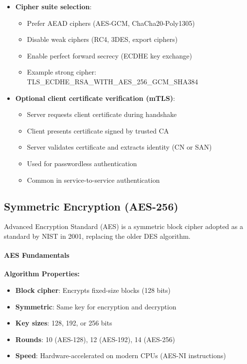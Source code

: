 \begin{itemize}
    \item \textbf{Cipher suite selection}:
    \begin{itemize}
        \item Prefer AEAD ciphers (AES-GCM, ChaCha20-Poly1305)
        \item Disable weak ciphers (RC4, 3DES, export ciphers)
        \item Enable perfect forward secrecy (ECDHE key exchange)
        \item Example strong cipher: TLS\_ECDHE\_RSA\_WITH\_AES\_256\_GCM\_SHA384
    \end{itemize}
    
    \item \textbf{Optional client certificate verification (mTLS)}:
    \begin{itemize}
        \item Server requests client certificate during handshake
        \item Client presents certificate signed by trusted CA
        \item Server validates certificate and extracts identity (CN or SAN)
        \item Used for passwordless authentication
        \item Common in service-to-service authentication
    \end{itemize}
\end{itemize}

\subsection{Symmetric Encryption (AES-256)}

Advanced Encryption Standard (AES) is a symmetric block cipher adopted as a standard by NIST in 2001, replacing the older DES algorithm.

\paragraph{AES Fundamentals}

\textbf{Algorithm Properties:}
\begin{itemize}
    \item \textbf{Block cipher}: Encrypts fixed-size blocks (128 bits)
    \item \textbf{Symmetric}: Same key for encryption and decryption
    \item \textbf{Key sizes}: 128, 192, or 256 bits
    \item \textbf{Rounds}: 10 (AES-128), 12 (AES-192), 14 (AES-256)
    \item \textbf{Speed}: Hardware-accelerated on modern CPUs (AES-NI instructions)
\end{itemize}

